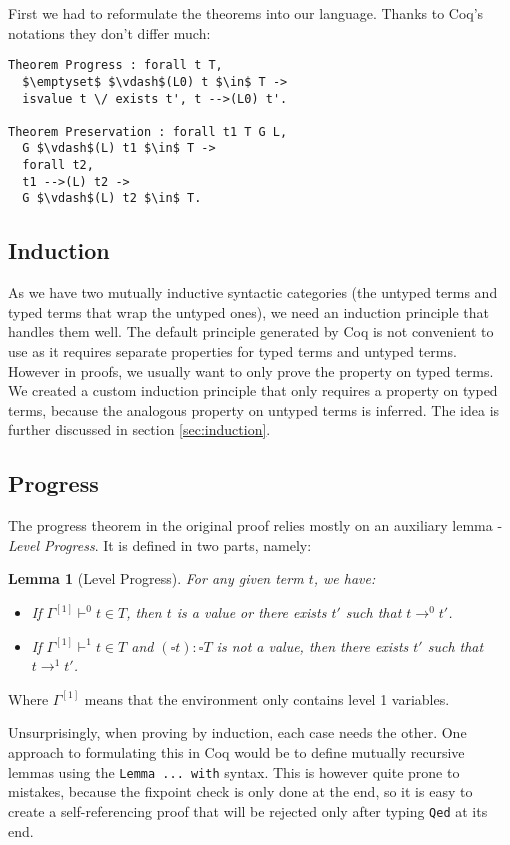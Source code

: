 \documentclass[runningheads]{article}
\newtheorem*{lemma}{Lemma}
\begin{document}
First we had to reformulate the theorems into our language. Thanks to Coq's notations they don't differ much:
\begin{lstlisting}[mathescape=true]
Theorem Progress : forall t T,
  $\emptyset$ $\vdash$(L0) t $\in$ T ->
  isvalue t \/ exists t', t -->(L0) t'.

Theorem Preservation : forall t1 T G L,
  G $\vdash$(L) t1 $\in$ T ->
  forall t2,
  t1 -->(L) t2 ->
  G $\vdash$(L) t2 $\in$ T.
\end{lstlisting}

\subsection{Induction}

As we have two mutually inductive syntactic categories (the untyped terms and typed terms that wrap the untyped ones), we need an induction principle that handles them well. The default principle generated by Coq is not convenient to use as it requires separate properties for typed terms and untyped terms. However in proofs, we usually want to only prove the property on typed terms. We created a custom induction principle that only requires a property on typed terms, because the analogous property on untyped terms is inferred. The idea is further discussed in section \ref{sec:induction}.

\subsection{Progress}

The progress theorem in the original proof relies mostly on an auxiliary lemma - \textit{Level Progress}. It is defined in two parts, namely:
\begin{lemma}[Level Progress]
For any given term $t$, we have:
\begin{itemize}
  \item[(1)]  If $\Gamma^{[1]} \vdash^0 t \in T$, then $t$ is a value or  there exists $t'$ such that $t \longrightarrow^0 t'$.
  \item[(2)] If $\Gamma^{[1]} \vdash^1 t \in T$ and $(\square t) : \square T$ is not a value,  then there exists $t'$ such that $t \longrightarrow^1 t'$.
\end{itemize}
\end{lemma}
Where $\Gamma^{[1]}$ means that the environment only contains level 1 variables.

Unsurprisingly, when proving by induction, each case needs the other. One approach to formulating this in Coq would be to define mutually recursive lemmas using the \verb|Lemma ... with| syntax. This is however quite prone to mistakes, because the fixpoint check is only done at the end, so it is easy to create a self-referencing proof that will be rejected only after typing \texttt{Qed} at its end.
\end{document}
